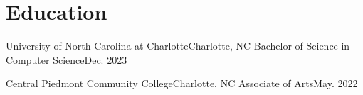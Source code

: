 \section{Education}
  \resumeSubHeadingListStart

    \resumeSubheading
      {University of North Carolina at Charlotte}{Charlotte, NC}
      {Bachelor of Science in Computer Science}{Dec. 2023}
      \resumeItemListStart
      \resumeItemListEnd

    \vspace{-5pt}

    \resumeSubheading
      {Central Piedmont Community College}{Charlotte, NC}
      {Associate of Arts}{May. 2022}

  \resumeSubHeadingListEnd